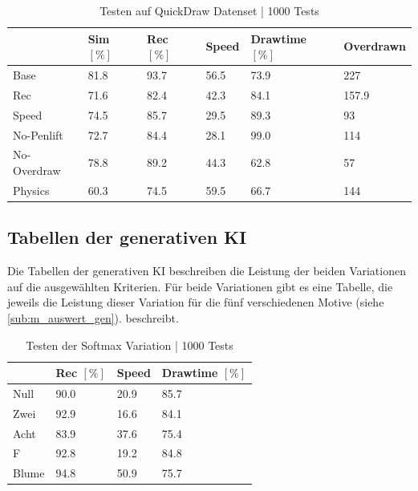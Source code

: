 \begin{table}[!ht]
    \centering
    \caption{Testen auf QuickDraw Datenset | 1000 Tests}\label{tab:Quickdraw}
    \begin{tabular}{|l|l|l|l|l|l|}
        \hline ~ & Sim $[\%]$ & Rec $[\%]$ & Speed & Drawtime $[\%]$ & Overdrawn \\ \hline
        Base & 81.8 & 93.7 & 56.5 & 73.9 & 227 \\ \hline
        Rec & 71.6 & 82.4 & 42.3 & 84.1 & 157.9 \\ \hline
        Speed & 74.5 & 85.7 & 29.5 & 89.3 & 93 \\ \hline
        No-Penlift & 72.7 & 84.4 & 28.1 & 99.0 & 114 \\ \hline
        No-Overdraw & 78.8 & 89.2 & 44.3 & 62.8 & 57 \\ \hline
        Physics & 60.3 & 74.5 & 59.5 & 66.7 & 144 \\ \hline
    \end{tabular}
\end{table}


\subsection{Tabellen der generativen KI}\label{sub:r_tab_gen} Die Tabellen der
generativen KI beschreiben die Leistung der beiden Variationen auf die
ausgewählten Kriterien. Für beide Variationen gibt es eine Tabelle, die jeweils
die Leistung dieser Variation für die fünf verschiedenen Motive (siehe
\ref{sub:m_auswert_gen}). beschreibt. 


\begin{table}[!ht]
    \centering
    \caption{Testen der Softmax Variation | 1000 Tests}\label{tab:gen-softmax}
    \begin{tabular}{|l|l|l|l|}
    \hline
        ~ & Rec $[\%]$ & Speed & Drawtime $[\%]$ \\ \hline
        Null & 90.0 & 20.9 & 85.7 \\ \hline
        Zwei & 92.9 & 16.6 & 84.1 \\ \hline
        Acht & 83.9 & 37.6 & 75.4 \\ \hline
        F & 92.8 & 19.2 & 84.8 \\ \hline
        Blume & 94.8 & 50.9 & 75.7 \\ \hline
    \end{tabular}
\end{table}

